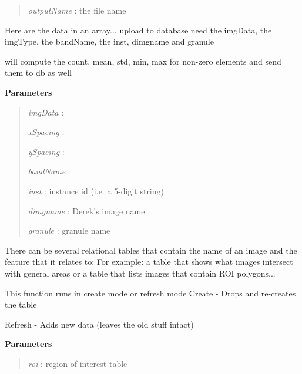 \documentclass[letterpaper,10pt,openany,oneside]{sphinxmanual}
\begin{document}
\begin{fulllineitems}
\begin{fulllineitems}
\begin{quote}
\emph{outputName} : the file name
\end{quote}

\end{fulllineitems}


\begin{fulllineitems}
\label{code:Database.Database.imgData2db}
Here are the data in an array... upload to database
need the imgData, the imgType, the bandName, the inst, dimgname and granule

will compute the count, mean, std, min, max for non-zero elements
and send them to db as well

\textbf{Parameters}
\begin{quote}

\emph{imgData}   :

\emph{xSpacing}  :

\emph{ySpacing}  :

\emph{bandName}  :

\emph{inst}      : instance id (i.e. a 5-digit string)

\emph{dimgname}  : Derek's image name

\emph{granule}   : granule name
\end{quote}

\end{fulllineitems}


\begin{fulllineitems}
\label{code:Database.Database.instimg2db}
There can be several relational tables that contain the name of an image
and the feature that it relates to:
For example:  a table that shows what images intersect with general areas or
a table that lists images that contain ROI polygons...

This function runs in create mode or refresh mode
Create - Drops and re-creates the table

Refresh - Adds new data (leaves the old stuff intact)

\textbf{Parameters}
\begin{quote}

\emph{roi}        : region of interest table


\end{quote}
\end{fulllineitems}
\end{fulllineitems}
\end{document}

